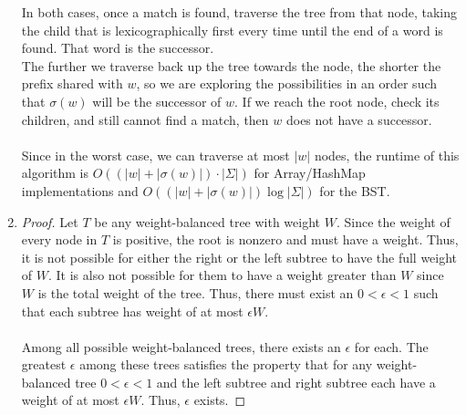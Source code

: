 \documentclass{article}
\theoremstyle{casestyle}
\begin{document}
\begin{enumerate}[i]
In both cases, once a match is found, traverse the tree from that node, taking the child that is lexicographically first every time until the end of a word is found. That word is the successor. \\

The further we traverse back up the tree towards the node, the shorter the prefix shared with $w$, so we are exploring the possibilities in an order such that $\sigma(w)$ will be the successor of $w$. If we reach the root node, check its children, and still cannot find a match, then $w$ does not have a successor.
\\\\
Since in the worst case, we can traverse at most $\left|w\right|$ nodes, the runtime of this algorithm is $O((\left|w\right|+\left|\sigma(w)\right|)\cdot\left|\Sigma\right|)$ for Array/HashMap implementations and $O((\left|w\right|+\left|\sigma(w)\right|)\log{\left|\Sigma\right|})$ for the BST.

\item 
\begin{proof}{}
  Let $T$ be any weight-balanced tree with weight $W$. Since the weight of every node in $T$ is positive, the root is nonzero and must have a weight. Thus, it is not possible for either the right or the left subtree to have the full weight of $W$. It is also not possible for them to have a weight greater than $W$ since $W$ is the total weight of the tree. Thus, there must exist an $0 < \epsilon < 1$ such that each subtree has weight of at most $\epsilon W$. \\\\
  Among all possible weight-balanced trees, there exists an $\epsilon$ for each. The greatest $\epsilon$ among these trees satisfies the property that for any weight-balanced tree $0 < \epsilon < 1$ and the left subtree and right subtree each have a weight of at most $\epsilon W$. Thus, $\epsilon$ exists.
\end{proof}


\end{enumerate}
\end{document}
